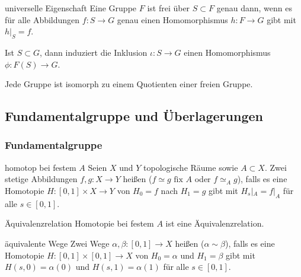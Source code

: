 \linie

\begin{Satz}{universelle Eigenschaft}
    Eine Gruppe $F$ ist frei über $S \subset F$ genau dann, wenn es für alle
    Abbildungen $f\colon S \rightarrow G$ genau einen Homomorphismus
    $h\colon F \rightarrow G$ gibt mit $h|_S = f$.
\end{Satz}

\begin{Kor}
    Ist $S \subset G$, dann induziert die Inklusion
    $\iota\colon S \rightarrow G$ einen Homomorphismus
    $\phi\colon F(S) \rightarrow G$.
\end{Kor}

\begin{Kor}
    Jede Gruppe ist isomorph zu einem Quotienten einer freien Gruppe.
\end{Kor}

\pagebreak

\subsection{%
    Fundamentalgruppe und Überlagerungen%
}

\subsubsection{%
    Fundamentalgruppe%
}

\begin{Def}{homotop bei festem $A$}
    Seien $X$ und $Y$ topologische Räume sowie $A \subset X$.
    Zwei stetige Abbildungen $f, g\colon X \rightarrow Y$ heißen
     ($f \simeq g \text{ fix } A$ oder
    $f \simeq_A g$), falls es eine Homotopie
    $H\colon [0, 1] \times X \rightarrow Y$ von $H_0 = f$ nach $H_1 = g$ gibt
    mit $H_s|_A = f|_A$ für alle $s \in [0, 1]$.
\end{Def}

\begin{Lemma}{Äquivalenzrelation}
    Homotopie bei festem $A$ ist eine Äquivalenzrelation.
\end{Lemma}

\linie

\begin{Def}{äquivalente Wege}
    Zwei Wege $\alpha, \beta\colon [0, 1] \rightarrow X$ heißen
     ($\alpha \sim \beta$), falls es eine Homotopie
    $H\colon [0, 1] \times [0, 1] \rightarrow X$ von $H_0 = \alpha$ und
    $H_1 = \beta$ gibt mit $H(s, 0) = \alpha(0)$ und $H(s, 1) = \alpha(1)$
    für alle $s \in [0, 1]$.
\end{Def}

